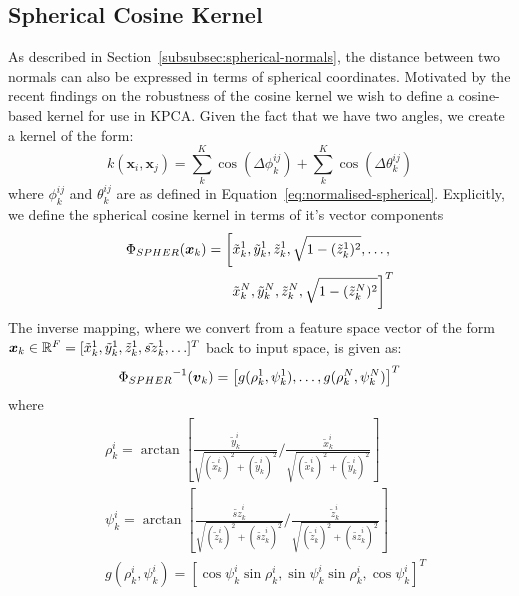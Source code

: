 \subsection{Spherical Cosine Kernel}\label{subsec:cosine-kernel}
As described in Section~\ref{subsubsec:spherical-normals}, the distance between two normals can also be expressed in terms of spherical coordinates. Motivated by the recent findings on the robustness of the cosine kernel \cite{RefWorks:5, RefWorks:68} we wish to define a cosine-based kernel for use in KPCA. Given the fact that we have two angles, we create a kernel of the form:
\begin{equation}\label{eq:spher-cosine-kernel}
    k(\boldsymbol{x}_i, \boldsymbol{x}_j) = \sum^K_k \cos(\Delta \phi^{ij}_k) + \sum^K_k \cos(\Delta \theta^{ij}_k)
\end{equation}
where $\phi^{ij}_k$ and $\theta^{ij}_k$ are as defined in Equation~\ref{eq:normalised-spherical}. Explicitly, we define the spherical cosine kernel in terms of it's vector components
\begin{equation}
    \begin{aligned}\label{eq:spher-kernel}
        \spher = \left[
                    \tilde{x}_k^1, \tilde{y}_k^1, \tilde{z}_k^1, \sqrt{1 - (\tilde{z}_k^1)^2}, \ldots, \right. \\
                    \left. \tilde{x}_k^N, \tilde{y}_k^N, \tilde{z}_k^N, \sqrt{1 - (\tilde{z}_k^N)^2}
                \right]^T
    \end{aligned}
\end{equation}
The inverse mapping, where we convert from a feature space vector of the form $\boldsymbol{x}_k \in \mathbb{R}^F = [\tilde{x}_k^1, \tilde{y}_k^1, \tilde{z}_k^1, \tilde{sz}_k^1, \ldots]^T$ back to input space, is given as:
\begin{equation}\label{eq:inv-spher-kernel}
    \invspher = \left[ g (\rho_k^1, \psi_k^1), \ldots, g (\rho_k^N, \psi_k^N) \right]^T
\end{equation}
where 
\begin{equation}
    \begin{aligned}\label{eq:inv-spher-g}
        &\rho_k^i = \arctan [ \frac{\tilde{y}_k^i}{\sqrt{(\tilde{x}_k^i)^2 + (\tilde{y}_k^i)^2}} / \frac{\tilde{x}_k^i}{\sqrt{(\tilde{x}_k^i)^2 + (\tilde{y}_k^i)^2}} ] \\
        &\psi_k^i = \arctan [ \frac{\tilde{sz}_k^i}{\sqrt{(\tilde{z}_k^i)^2 + (\tilde{sz}_k^i)^2}} / \frac{\tilde{z}_k^i}{\sqrt{(\tilde{z}_k^i)^2 + (\tilde{sz}_k^i)^2}} ] \\
        &g(\rho_k^i, \psi_k^i) = [\cos \psi_k^i \sin \rho_k^i, \sin \psi_k^i \sin \rho_k^i, \cos \psi_k^i]^T
    \end{aligned}
\end{equation}
